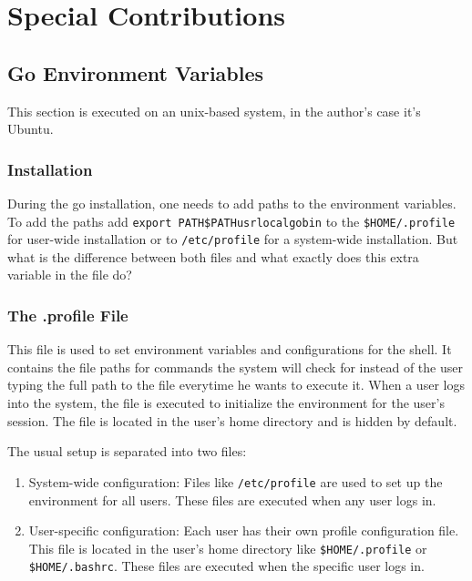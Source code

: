 \chapter{Special Contributions}
\label{ch:special_contributions}

\section{Go Environment Variables}
\label{sec:go_environment_variables}
This section is executed on an unix-based system, in the author's case it's Ubuntu.

\subsection{Installation}
During the go installation, one needs to add paths to the environment variables.
To add the paths add \texttt{export PATH\=\$PATH\:\/usr\/local\/go\/bin} 
to the \texttt{\$HOME/.profile} for user-wide installation or to \texttt{/etc/profile} for a system-wide installation.
But what is the difference between both files and what exactly does this extra variable in the file do?

\subsection{The .profile File}
This file is used to set environment variables and configurations for the shell.
It contains the file paths for commands the system will check for instead of the user typing the full path to the file everytime he wants to execute it.
When a user logs into the system, the file is executed to initialize the environment for the user's session.
The file is located in the user's home directory and is hidden by default.

The usual setup is separated into two files:
\begin{enumerate}
    \item System-wide configuration:
        Files like \texttt{/etc/profile} are used to set up the environment for all users.
        These files are executed when any user logs in.
    \item User-specific configuration:
        Each user has their own profile configuration file.
        This file is located in the user's home directory like \texttt{\$HOME/.profile} or \texttt{\$HOME/.bashrc}.
        These files are executed when the specific user logs in.
\end{enumerate}

